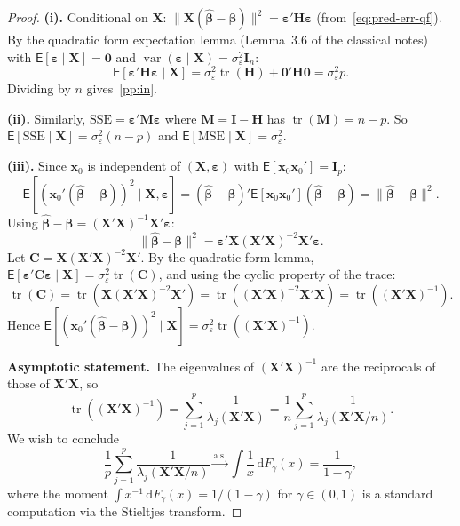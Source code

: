 \documentclass[14pt]{extarticle}
\theoremstyle{plain}
\theoremstyle{definition}
\theoremstyle{remark}
\newcommand\expc{\mathsf{E}}
\DeclareMathOperator\var{var}
\DeclareMathOperator\tr{tr}
\newcommand{\SSE}{\mathrm{SSE}}
\newcommand{\MSE}{\mathrm{MSE}}
\newcommand{\bX}{\mathbf{X}}
\newcommand{\bx}{\mathbf{x}}
\def\bb{\boldsymbol{\beta}}
\newcommand{\be}{\boldsymbol{\varepsilon}}
\newcommand{\bI}{\mathbf{I}}
\newcommand{\bH}{\mathbf{H}}
\newcommand{\bM}{\mathbf{M}}
\newcommand{\bzero}{\mathbf{0}}
\newcommand{\bC}{\mathbf{C}}
\newcommand{\hbb}{\hat{\boldsymbol{\beta}}}
\newcommand{\dd}{\mathrm{d}}
\begin{document}
\begin{proof}
\textbf{(i).} Conditional on $\bX$: $\|\bX(\hbb-\bb)\|^2 = \be'\bH\be$ (from~\eqref{eq:pred-err-qf}). By the quadratic form expectation lemma (Lemma~3.6 of the classical notes) with $\expc[\be \mid \bX] = \bzero$ and $\var(\be \mid \bX) = \sigma_\varepsilon^2\bI_n$:
\[
\expc[\be'\bH\be \mid \bX] = \sigma_\varepsilon^2\tr(\bH) + \bzero'\bH\bzero = \sigma_\varepsilon^2 p.
\]
Dividing by $n$ gives~\ref{pp:in}.

\textbf{(ii).} Similarly, $\SSE = \be'\bM\be$ where $\bM = \bI - \bH$ has $\tr(\bM) = n - p$. So $\expc[\SSE \mid \bX] = \sigma_\varepsilon^2(n-p)$ and $\expc[\MSE \mid \bX] = \sigma_\varepsilon^2$.

\textbf{(iii).} Since $\bx_0$ is independent of $(\bX, \be)$ with $\expc[\bx_0\bx_0'] = \bI_p$:
\[
\expc[(\bx_0'(\hbb-\bb))^2 \mid \bX, \be] = (\hbb-\bb)'\expc[\bx_0\bx_0'](\hbb-\bb) = \|\hbb-\bb\|^2.
\]
Using $\hbb - \bb = (\bX'\bX)^{-1}\bX'\be$:
\[
\|\hbb-\bb\|^2 = \be'\bX(\bX'\bX)^{-2}\bX'\be.
\]
Let $\bC = \bX(\bX'\bX)^{-2}\bX'$. By the quadratic form lemma, $\expc[\be'\bC\be \mid \bX] = \sigma_\varepsilon^2\tr(\bC)$, and using the cyclic property of the trace:
\[
\tr(\bC) = \tr(\bX(\bX'\bX)^{-2}\bX') = \tr((\bX'\bX)^{-2}\bX'\bX) = \tr((\bX'\bX)^{-1}).
\]
Hence $\expc[(\bx_0'(\hbb-\bb))^2 \mid \bX] = \sigma_\varepsilon^2\tr((\bX'\bX)^{-1})$.

\textbf{Asymptotic statement.} The eigenvalues of $(\bX'\bX)^{-1}$ are the reciprocals of those of $\bX'\bX$, so
\[
\tr((\bX'\bX)^{-1}) = \sum_{j=1}^p \frac{1}{\lambda_j(\bX'\bX)} = \frac{1}{n}\sum_{j=1}^p \frac{1}{\lambda_j(\bX'\bX/n)}.
\]
We wish to conclude
\begin{equation}\label{eq:mp-trace-limit}
\frac{1}{p}\sum_{j=1}^p\frac{1}{\lambda_j(\bX'\bX/n)} \xrightarrow{\text{a.s.}} \int\frac{1}{x}\,\dd F_\gamma(x) = \frac{1}{1-\gamma},
\end{equation}
where the moment $\int x^{-1}\,\dd F_\gamma(x) = 1/(1-\gamma)$ for $\gamma \in (0,1)$ is a standard computation via the Stieltjes transform.


\end{proof}
\end{document}
